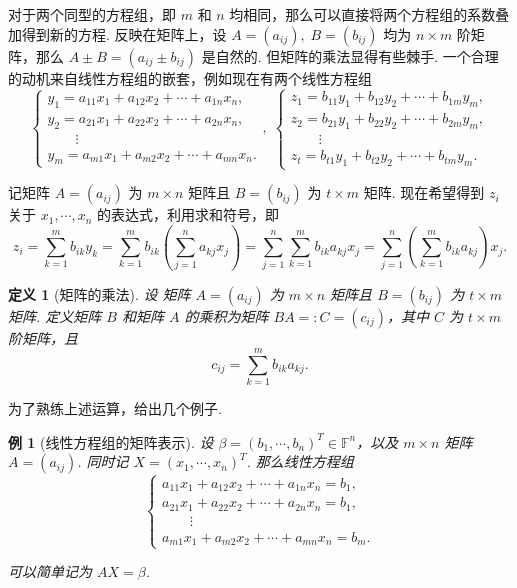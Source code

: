 \documentclass[10pt,openany]{article}
\theoremstyle{thmstyle} %
\theoremstyle{defstyle} %
\newtheorem{definition}[theorem]{定义}
\theoremstyle{prostyle} %
\newtheorem{example}[theorem]{例}
\begin{document}
对于两个同型的方程组，即 \( m \) 和 \( n \) 均相同，那么可以直接将两个方程组的系数叠加得到新的方程. 反映在矩阵上，设 \( A=(a_{ij}), \; B=(b_{ij}) \) 均为 \( n \times m \) 阶矩阵，那么 \( A \pm B=(a_{ij} \pm b_{ij}) \) 是自然的. 但矩阵的乘法显得有些棘手. 一个合理的动机来自线性方程组的嵌套，例如现在有两个线性方程组
\[ \left\{ \begin{array}{l}
	y_1= a_{11}x_1+a_{12}x_2+\cdots+a_{1n}x_n, \\
	y_2= a_{21}x_1+a_{22}x_2+\cdots+a_{2n}x_n, \\
	\qquad \vdots \\
	y_m= a_{m1}x_1+a_{m2}x_2+\cdots+a_{mn}x_n.
\end{array}\right. , \; \left\{ \begin{array}{l}
z_1= b_{11}y_1+b_{12}y_2+\cdots+b_{1m}y_m, \\
z_2= b_{21}y_1+b_{22}y_2+\cdots+b_{2m}y_m, \\
\qquad \vdots \\
z_t= b_{t1}y_1+b_{t2}y_2+\cdots+b_{tm}y_m.
\end{array}\right. \]

记矩阵 \( A=(a_{ij}) \) 为 \( m \times n \) 矩阵且 \( B=(b_{ij}) \) 为 \( t\times m \) 矩阵. 现在希望得到 \( z_i \) 关于 \( x_1,\cdots,x_n \) 的表达式，利用求和符号，即
\[ z_i=\sum_{k=1}^{m} b_{ik}y_k= \sum_{k=1}^{m} b_{ik} \left( \sum_{j=1}^{n} a_{kj} x_j \right)= \sum_{j=1}^{n} \sum_{k=1}^{m} b_{ik}a_{kj} x_j = \sum_{j=1}^{n} \left( \sum_{k=1}^{m} b_{ik}a_{kj}\right) x_j. \]

\begin{definition}[矩阵的乘法]
	设 矩阵 \( A=(a_{ij}) \) 为 \( m \times n \) 矩阵且 \( B=(b_{ij}) \) 为 \( t\times m \) 矩阵. 定义矩阵 \( B \) 和矩阵 \( A \) 的乘积为矩阵 \( BA=:C=(c_{ij}) \)，其中 \( C \) 为 \( t \times m \) 阶矩阵，且
	\[ c_{ij}=\sum_{k=1}^{m} b_{ik}a_{kj}. \] 
\end{definition}

为了熟练上述运算，给出几个例子.

\begin{example}[线性方程组的矩阵表示]
	设 \( \beta=(b_1,\cdots,b_n)^T \in \mathbb{F}^n \)，以及 \( m \times n \) 矩阵 \( A=(a_{ij}) \). 同时记 \( X=(x_1,\cdots,x_n)^T  \). 那么线性方程组
	\[ \left\{\begin{array}{l}
		a_{11}x_1+a_{12}x_2+\cdots+a_{1n}x_n=b_1, \\
		a_{21}x_1+a_{22}x_2+\cdots+a_{2n}x_n=b_1, \\
		\qquad \vdots \\
		a_{m1}x_1+a_{m2}x_2+\cdots+a_{mn}x_n=b_m.
	\end{array}\right. \]
	
	可以简单记为 \( AX=\beta \).
\end{example}
\end{document}
